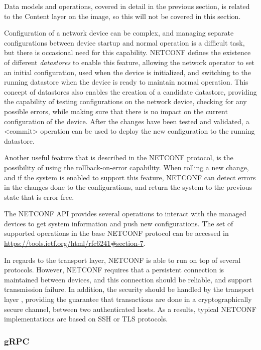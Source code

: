 \par Data models and operations, covered in detail in the previous section, is related to the Content layer on the image, so this will not be covered in this section. 
\par Configuration of a network device can be complex, and managing separate configurations between device startup and normal operation is a difficult task, but there is occasional need for this capability. NETCONF defines the 
existence of different \textit{datastores} to enable this feature, allowing the network operator to set an initial configuration, used when the device is initialized, and switching to the running datastore when the device is ready
to maintain normal operation. This concept of datastores also enables the creation of a candidate datastore, providing the capability of testing configurations on the network device, checking for any possible errors, while making
sure that there is no impact on the current configuration of the device. After the changes have been tested and validated, a <commit> operation can be used to deploy the new configuration to the running datastore.
\par Another useful feature that is described in the NETCONF protocol, is the possibility of using the rollback-on-error capability. When rolling a new change, and if the system is enabled to support this feature,
NETCONF can detect errors in the changes done to the configurations, and return the system to the previous state that is error free. 
\par The NETCONF API provides several operations to interact with the managed devices to get system information and push new configurations. The set of supported operations in the base NETCONF protocol can be accessed in 
\url{https://tools.ietf.org/html/rfc6241#section-7}. 
\par In regards to the transport layer, NETCONF is able to run on top of several protocols. However, NETCONF requires that a persistent connection is maintained between devices, and this connection should be reliable, and support
transmission failure. In addition, the security should be handled by the transport layer \cite { CITE - https://www.ietf.org/slides/slides-edu-netconf-yang-00.pdf}, providing the guarantee that transactions are done in a 
cryptographically secure channel, between two authenticated hosts. As a results, typical NETCONF implementations are based on SSH or TLS protocols.

\subsubsection {gRPC}  \label {ssec:grpc}

